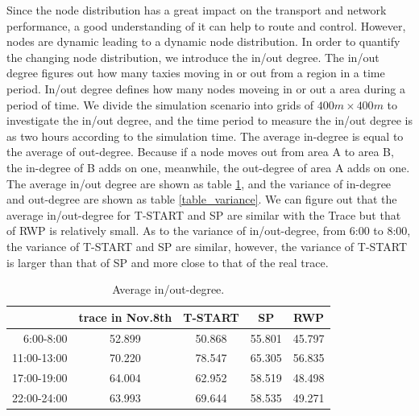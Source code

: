 Since the node distribution has a great impact on the transport and network performance, a good understanding of it can help to route and control.  However, nodes are dynamic leading to a dynamic node distribution. In order to quantify the changing node distribution,  we introduce the in/out degree. The in/out degree figures out how many taxies moving in or out from a region in a time period. In/out degree defines how many nodes moveing in or out a area during a period of time. 
We divide the simulation scenario into grids of $ 400m \times 400 m$ to investigate the in/out degree, and the time period to measure the in/out degree is as two hours according to the simulation time. 
The average in-degree is equal to the average of out-degree. Because if a node moves out from area A to area B, the in-degree of B adds on one, meanwhile, the out-degree of area A adds on one. The average in/out degree are shown as table \ref{table_avg_inoutdegree}, and the variance of in-degree and out-degree are shown as table \ref{table_variance}.
We can figure out that the average in/out-degree for T-START and SP are similar with the Trace but that of RWP is relatively small. As to the variance of in/out-degree, from 6:00 to 8:00, the variance of T-START and SP are similar, however, the variance of T-START is larger than that of SP and more close to that of the real trace.  
\begin{table}[!h]
\caption{Average in/out-degree.}\label{table_avg_inoutdegree}
\centering
\begin{tabular}{r|c|c|c|c}
\hline
	&trace in Nov.8th	&T-START &SP &RWP\\
\hline
6:00-8:00&
52.899&50.868&55.801&45.797\\
11:00-13:00&
70.220&78.547&65.305&56.835\\  
17:00-19:00&
64.004&62.952&58.519&	48.498\\
22:00-24:00&
63.993&69.644&	58.535&	49.271\\	
\hline
\end{tabular}
\end{table}

